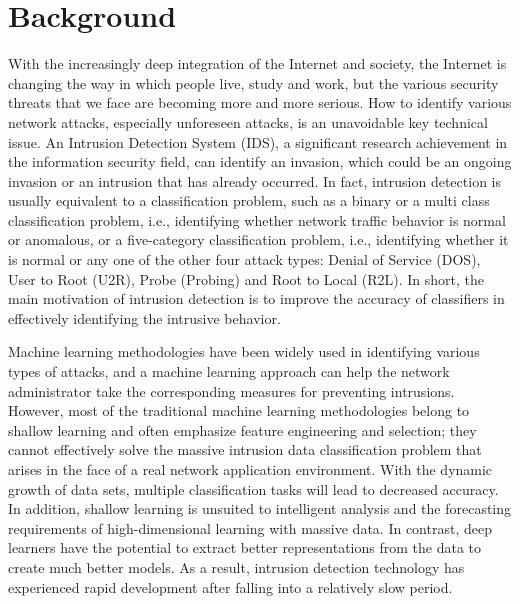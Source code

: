 \section{Background}\label{sec:bkgrnd}%
\vspace{-18pt}
With the increasingly deep integration of the Internet and society, the Internet is changing the way in which people live, study and work, but the various security threats that we face are becoming more and more serious. How to identify various network attacks, especially unforeseen attacks, is an unavoidable key technical issue. An Intrusion Detection System (IDS), a significant research achievement in the information security field, can identify an invasion, which could be an ongoing invasion or an intrusion that has already occurred. In fact, intrusion detection is usually equivalent to a classification problem, such as a binary or a multi class classification problem, i.e., identifying whether network traffic behavior is normal or anomalous, or a five-category classification problem, i.e., identifying whether it is normal or any one of the other four attack types: Denial of Service (DOS), User to Root (U2R), Probe (Probing) and Root to Local (R2L). In short, the main motivation of intrusion detection is to improve the accuracy of classifiers in effectively identifying the intrusive behavior.\par
Machine learning methodologies have been widely used in identifying various types of attacks, and a machine learning approach can help the network administrator take the corresponding measures for preventing intrusions. However, most of the traditional machine learning methodologies belong to shallow learning and often emphasize feature engineering and selection; they cannot effectively solve the massive intrusion data classification problem that arises in the face of a real network application environment. With the dynamic growth of data sets, multiple classification tasks will lead to decreased accuracy. In addition, shallow learning is unsuited to intelligent analysis and the forecasting requirements of high-dimensional learning with massive data. In contrast, deep learners have the potential to extract better representations from the data to create much better models. As a result, intrusion detection technology has experienced rapid development after falling into a relatively slow period.\cite{yin2017deep}%
\par
